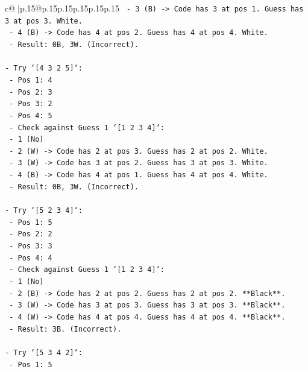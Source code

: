 \documentclass{article}
\begin{document}
{\begin{supertabular}{c@{$\;$}|p{.15\linewidth}@{}p{.15\linewidth}p{.15\linewidth}p{.15\linewidth}p{.15\linewidth}p{.15\linewidth}}
{{{\texttt{        {-}   3 (B) {-}> Code has 3 at pos 1. Guess has 3 at pos 3. White.} \\
\texttt{        {-}   4 (B) {-}> Code has 4 at pos 2. Guess has 4 at pos 4. White.} \\
\texttt{        {-}   Result: 0B, 3W. (Incorrect).} \\
\\ 
\texttt{{-}   Try `{[}4 3 2 5{]}`:} \\
\texttt{    {-}   Pos 1: 4} \\
\texttt{    {-}   Pos 2: 3} \\
\texttt{    {-}   Pos 3: 2} \\
\texttt{    {-}   Pos 4: 5} \\
\texttt{    {-}   Check against Guess 1 `{[}1 2 3 4{]}`:} \\
\texttt{        {-}   1 (No)} \\
\texttt{        {-}   2 (W) {-}> Code has 2 at pos 3. Guess has 2 at pos 2. White.} \\
\texttt{        {-}   3 (W) {-}> Code has 3 at pos 2. Guess has 3 at pos 3. White.} \\
\texttt{        {-}   4 (B) {-}> Code has 4 at pos 1. Guess has 4 at pos 4. White.} \\
\texttt{        {-}   Result: 0B, 3W. (Incorrect).} \\
\\ 
\texttt{{-}   Try `{[}5 2 3 4{]}`:} \\
\texttt{    {-}   Pos 1: 5} \\
\texttt{    {-}   Pos 2: 2} \\
\texttt{    {-}   Pos 3: 3} \\
\texttt{    {-}   Pos 4: 4} \\
\texttt{    {-}   Check against Guess 1 `{[}1 2 3 4{]}`:} \\
\texttt{        {-}   1 (No)} \\
\texttt{        {-}   2 (B) {-}> Code has 2 at pos 2. Guess has 2 at pos 2. **Black**.} \\
\texttt{        {-}   3 (W) {-}> Code has 3 at pos 3. Guess has 3 at pos 3. **Black**.} \\
\texttt{        {-}   4 (W) {-}> Code has 4 at pos 4. Guess has 4 at pos 4. **Black**.} \\
\texttt{        {-}   Result: 3B. (Incorrect).} \\
\\ 
\texttt{{-}   Try `{[}5 3 4 2{]}`:} \\
\texttt{    {-}   Pos 1: 5} \\
}}}
\end{supertabular}}
\end{document}
